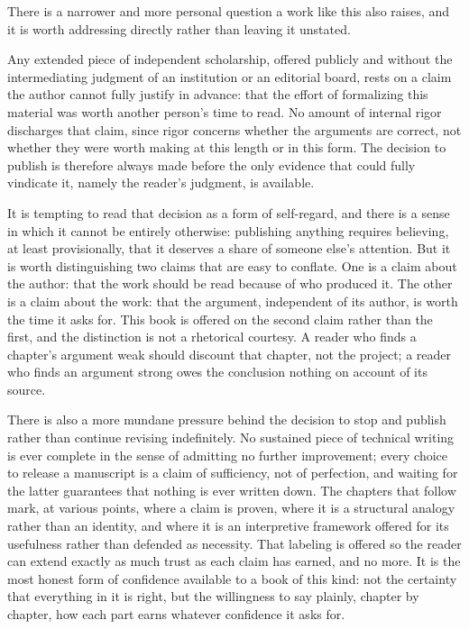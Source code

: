 \documentclass[11pt,fleqn]{book}
\numberwithin{equation}{chapter}
\theoremstyle{plain}
\theoremstyle{definition}
\theoremstyle{remark}
\begin{document}
There is a narrower and more personal question a work like this also raises, and it is worth addressing directly rather than leaving it unstated.

Any extended piece of independent scholarship, offered publicly and without the intermediating judgment of an institution or an editorial board, rests on a claim the author cannot fully justify in advance: that the effort of formalizing this material was worth another person's time to read. No amount of internal rigor discharges that claim, since rigor concerns whether the arguments are correct, not whether they were worth making at this length or in this form. The decision to publish is therefore always made before the only evidence that could fully vindicate it, namely the reader's judgment, is available.

It is tempting to read that decision as a form of self-regard, and there is a sense in which it cannot be entirely otherwise: publishing anything requires believing, at least provisionally, that it deserves a share of someone else's attention. But it is worth distinguishing two claims that are easy to conflate. One is a claim about the author: that the work should be read because of who produced it. The other is a claim about the work: that the argument, independent of its author, is worth the time it asks for. This book is offered on the second claim rather than the first, and the distinction is not a rhetorical courtesy. A reader who finds a chapter's argument weak should discount that chapter, not the project; a reader who finds an argument strong owes the conclusion nothing on account of its source.

There is also a more mundane pressure behind the decision to stop and publish rather than continue revising indefinitely. No sustained piece of technical writing is ever complete in the sense of admitting no further improvement; every choice to release a manuscript is a claim of sufficiency, not of perfection, and waiting for the latter guarantees that nothing is ever written down. The chapters that follow mark, at various points, where a claim is proven, where it is a structural analogy rather than an identity, and where it is an interpretive framework offered for its usefulness rather than defended as necessity. That labeling is offered so the reader can extend exactly as much trust as each claim has earned, and no more. It is the most honest form of confidence available to a book of this kind: not the certainty that everything in it is right, but the willingness to say plainly, chapter by chapter, how each part earns whatever confidence it asks for.
\end{document}
